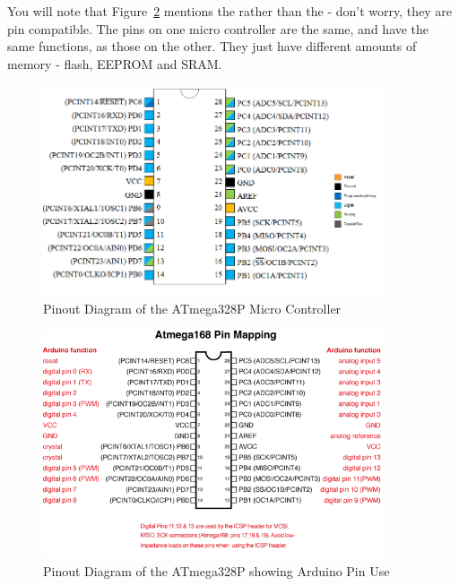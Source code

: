 \begin{note}
	You will note that Figure~\ref{fig-arduino-uno-pinout} mentions the  rather than the  - don't worry, they are pin compatible. The pins on one micro controller are the same, and have the same functions, as those on the other. They just have different amounts of memory - flash, EEPROM and SRAM.
\end{note}	

\begin{figure}[p]
	\centering
	\includegraphics[width=0.9\textwidth]{Content/images/ATmega328P-pins}
	\caption{Pinout Diagram of the ATmega328P Micro Controller}
	\label{fig-atmega328p-pinout}
\end{figure}

\begin{figure}[p]
	\centering
	\includegraphics[width=0.9\textwidth]{Content/images/ArduinoUno-pins}
	\caption{Pinout Diagram of the ATmega328P showing Arduino Pin Use}
	\label{fig-arduino-uno-pinout}
\end{figure}

